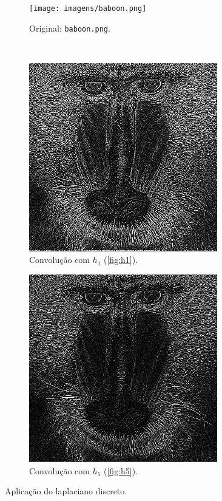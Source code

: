 \begin{figure}[H]
    \centering
    \begin{subfigure}{0.48\textwidth}
        \centering
        \texttt{[image: imagens/baboon.png]}
        \caption{Original: \texttt{baboon.png}.}
    \end{subfigure}\\[8pt]
    \begin{subfigure}{0.48\textwidth}
        \centering
        \includegraphics[width=0.9\textwidth]{resultados/baboon_h1.png}
        \caption{Convolução com $h_1$ (\ref{fig:h1}).}
        \label{fig:borda:viz4}
    \end{subfigure}%
    \begin{subfigure}{0.48\textwidth}
        \centering
        \includegraphics[width=0.9\textwidth]{resultados/baboon_h5.png}
        \caption{Convolução com $h_5$ (\ref{fig:h5}).}
        \label{fig:borda:viz8}
    \end{subfigure}

    \caption{Aplicação do laplaciano discreto.}
\end{figure}

